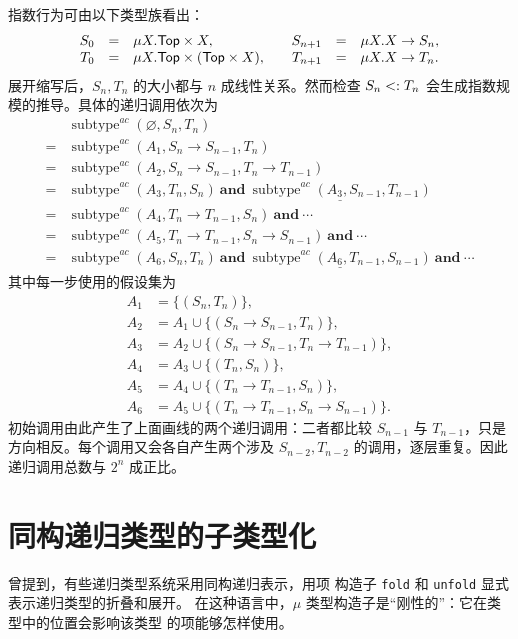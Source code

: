 指数行为可由以下类型族看出：
\[
\begin{array}{rcl@{\qquad}rcl}
S_0&=&\mu X.\tapltype{Top}\times X,&
S_{n+1}&=&\mu X.X\to S_n,\\
T_0&=&\mu X.\tapltype{Top}\times(\tapltype{Top}\times X),&
T_{n+1}&=&\mu X.X\to T_n.
\end{array}
\]
展开缩写后，\(S_n,T_n\) 的大小都与 \(n\) 成线性关系。然而检查
\(S_n\mathrel{<:} T_n\) 会生成指数规模的推导。具体的递归调用依次为
\[
\begin{aligned}
&\operatorname{subtype}^{ac}(\varnothing,S_n,T_n)\\
={}&\operatorname{subtype}^{ac}(A_1,S_n\to S_{n-1},T_n)\\
={}&\operatorname{subtype}^{ac}(A_2,S_n\to S_{n-1},T_n\to T_{n-1})\\
={}&\operatorname{subtype}^{ac}(A_3,T_n,S_n)\ \mathbf{and}\
   \underline{\operatorname{subtype}^{ac}(A_3,S_{n-1},T_{n-1})}\\
={}&\operatorname{subtype}^{ac}(A_4,T_n\to T_{n-1},S_n)\ \mathbf{and}\ \cdots\\
={}&\operatorname{subtype}^{ac}(A_5,T_n\to T_{n-1},S_n\to S_{n-1})
   \ \mathbf{and}\ \cdots\\
={}&\operatorname{subtype}^{ac}(A_6,S_n,T_n)\ \mathbf{and}\
   \underline{\operatorname{subtype}^{ac}(A_6,T_{n-1},S_{n-1})}
   \ \mathbf{and}\ \cdots
\end{aligned}
\]
其中每一步使用的假设集为
\[
\begin{aligned}
A_1&=\{(S_n,T_n)\},\\
A_2&=A_1\cup\{(S_n\to S_{n-1},T_n)\},\\
A_3&=A_2\cup\{(S_n\to S_{n-1},T_n\to T_{n-1})\},\\
A_4&=A_3\cup\{(T_n,S_n)\},\\
A_5&=A_4\cup\{(T_n\to T_{n-1},S_n)\},\\
A_6&=A_5\cup\{(T_n\to T_{n-1},S_n\to S_{n-1})\}.
\end{aligned}
\]
初始调用由此产生了上面画线的两个递归调用：二者都比较
\(S_{n-1}\) 与 \(T_{n-1}\)，只是方向相反。每个调用又会各自产生两个涉及
\(S_{n-2},T_{n-2}\) 的调用，逐层重复。因此递归调用总数与 \(2^n\) 成正比。

\section{同构递归类型的子类型化}
\label{sec:21.11}

曾提到，有些递归类型系统采用同构递归表示，用项
构造子 \texttt{fold} 和 \texttt{unfold} 显式表示递归类型的折叠和展开。
在这种语言中，\(\mu\) 类型构造子是“刚性的”：它在类型中的位置会影响该类型
的项能够怎样使用。

